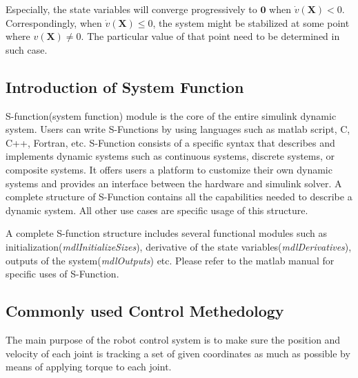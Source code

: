 \documentclass[a4paper]{article}
\begin{document}
Especially, the state variables will converge progressively to $\boldsymbol{0}$ when $\dot{v}(\boldsymbol{X})< 0$. Correspondingly, when $\dot{v}(\boldsymbol{X})\leq 0$, 
the system might be stabilized at some point where $v(\boldsymbol{X})\neq 0$. The particular value of that point need to be determined in such case. 


\subsection{Introduction of System Function}

S-function(system function) module is the core of the entire simulink dynamic system. Users can write S-Functions by using  languages such as matlab script, C, C++, Fortran, etc. S-Function consists of a specific syntax that describes and implements dynamic systems such as continuous systems, discrete systems, or composite systems. It offers users a platform to customize their own dynamic systems and provides an interface between the hardware and simulink solver.  A complete structure of S-Function contains all the capabilities needed to describe a dynamic system. All other use cases are specific usage of this structure. 

A complete S-function structure includes several functional modules such as initialization(\emph{mdlInitializeSizes}), derivative of the state variables(\emph{mdlDerivatives}), outputs of the system(\emph{mdlOutputs}) etc. Please refer to the matlab manual for specific uses of S-Function. 


\subsection{Commonly used Control Methedology}
The main purpose of the robot control system is to make sure the position and velocity of each joint is tracking a set of given coordinates as much as possible by means of applying torque to each joint. \par
\end{document}

